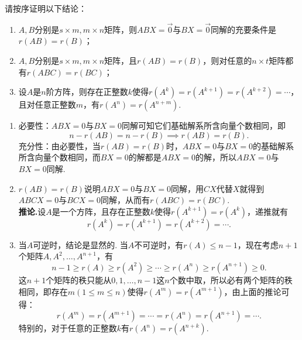 \begin{exercise}
\begin{exgroup}
        \item 请按序证明以下结论：
        \begin{enumerate}
            \item $A,B$分别是$s \times m,m \times n$矩阵，则$ABX=\vec{0}$与$BX=\vec{0}$同解的充要条件是$r(AB)=r(B)$；

            \item $A,B$分别是$s \times m,m \times n$矩阵，且$r(AB)=r(B)$，则对任意的$n \times t$矩阵都有$r(ABC)=r(BC)$；

            \item 设$A$是$n$阶方阵，则存在正整数$k$使得$r(A^k)=r(A^{k+1})=r(A^{k+2})=\cdots$，且对任意正整数$m$，有$r(A^n)=r(A^{n+m})$.
        \end{enumerate}
        \begin{answer}
            \begin{enumerate}
                \item 必要性：$ABX=0$与$BX=0$同解可知它们基础解系所含向量个数相同，即
                      \[ n-r(AB)=n-r(B)\implies r(AB)=r(B). \]
                      充分性：由必要性，当$r(AB)=r(B)$时，$ABX=0$与$BX=0$的基础解系所含向量个数相同，而$BX=0$的解都是$ABX=0$的解，所以$ABX=0$与$BX=0$同解.

                \item $r(AB)=r(B)$说明$ABX=0$与$BX=0$同解，用$CX$代替$X$就得到$ABCX=0$与$BCX=0$同解，从而有$r(ABC)=r(BC)$.\\
                      \textbf{推论.}设$A$是一个方阵，且存在正整数$k$使得$r(A^{k+1})=r(A^k)$，递推就有
                      \[ r(A^k)=r(A^{k+1})=r(A^{k+2})=\cdots. \]

                \item 当$A$可逆时，结论是显然的. 当$A$不可逆时，有$r(A)\leqslant n-1$，现在考虑$n+1$个矩阵$A,A^2,\ldots,A^{n+1}$，有
                      \[ n-1\geqslant r(A)\geqslant r(A^2)\geqslant\cdots\geqslant r(A^n)\geqslant r(A^{n+1})\geqslant 0. \]
                      这$n+1$个矩阵的秩只能从$0,1,\ldots,n-1$这$n$个数中取，所以必有两个矩阵的秩相同，即存在$m(1\leqslant m\leqslant n)$使得$r(A^m)=r(A^{m+1})$，由上面的推论可得：
                      \[ r(A^m)=r(A^{m+1})=\cdots=r(A^{n})=r(A^{n+1})=\cdots. \]
                      特别的，对于任意的正整数$k$有$r(A^n)=r(A^{n+k})$.
            \end{enumerate}
        \end{answer}


\end{exgroup}
\end{exercise}
